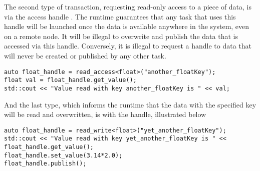 The second type of transaction, requesting read-only access to a piece of data, is via the access handle . The runtime
guarantees that any task that uses this handle will be launched once the data is available anywhere in the system, even on a remote node.
It will be illegal to overwrite and publish the data that is accessed via this handle. Conversely, it is illegal to request a 
handle to data that will never be created or published by any other task.
\begin{lstlisting}
auto float_handle = read_access<float>("another_floatKey");
float val = float_handle.get_value();
std::cout << "Value read with key another_floatKey is " << val;
\end{lstlisting}

And the last type, which informs the runtime that the data with the specified key will be read and overwritten, is with the 
handle, illustrated below
\begin{lstlisting}
auto float_handle = read_write<float>("yet_another_floatKey");
std::cout << "Value read with key yet_another_floatKey is " << float_handle.get_value();
float_handle.set_value(3.14*2.0);
float_handle.publish();
\end{lstlisting}





